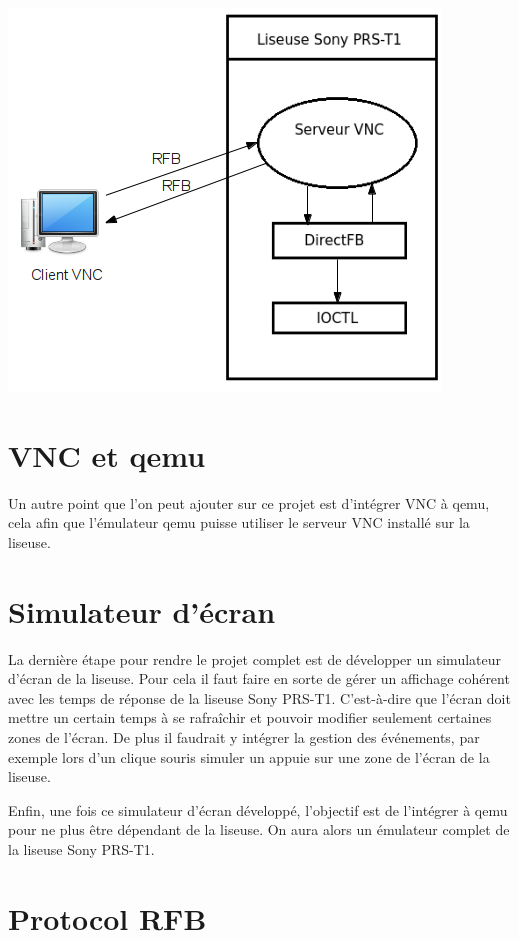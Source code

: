 \begin{center}
	\includegraphics{VNCClientServeur.png}
\end{center}

\section{VNC et qemu}

Un autre point que l'on peut ajouter sur ce projet est d'intégrer VNC à qemu, cela afin que l'émulateur qemu puisse utiliser le serveur VNC installé sur la liseuse.


\section{Simulateur d'écran}

La dernière étape pour rendre le projet complet est de développer un simulateur d'écran de la liseuse. Pour cela il faut faire en sorte de gérer un affichage cohérent avec les temps de réponse de la liseuse Sony PRS-T1. C'est-à-dire que l'écran doit mettre un certain temps à se rafraîchir et pouvoir modifier seulement certaines zones de l'écran. De plus il faudrait y intégrer la gestion des événements, par exemple lors d'un clique souris simuler un appuie sur une zone de l'écran de la liseuse.

Enfin, une fois ce simulateur d'écran développé, l'objectif est de l'intégrer à qemu pour ne plus être dépendant de la liseuse. On aura alors un émulateur complet de la liseuse Sony PRS-T1.


\section{Protocol RFB}

